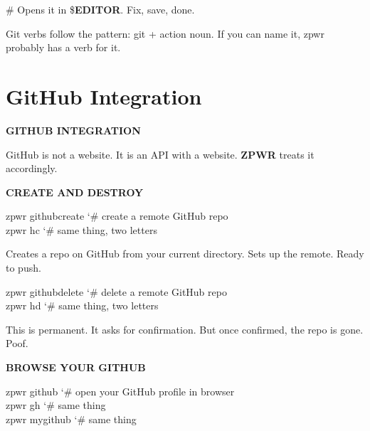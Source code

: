 \documentclass[11pt,a4paper,twoside]{book}
\begin{document}
\# Opens it in \$\textbf{EDITOR}. Fix, save, done.

Git verbs follow the pattern: git + action noun. If you can name it, zpwr probably has a verb for it.


\vspace{16pt}

\section{GitHub Integration}


\vspace{10pt}
{\large\bfseries\color{neoncyan} GITHUB INTEGRATION}\vspace{6pt}

GitHub is not a website. It is an API with a website. \textbf{ZPWR} treats it accordingly.


\vspace{12pt}
{\bfseries\color{neonyellow} CREATE AND DESTROY}\vspace{4pt}

\begin{codebox}
\color{neongreen}zpwr githubcreate      {\char`\#} create a remote GitHub repo\\
\color{neongreen}zpwr hc               {\char`\#} same thing, two letters\\
\end{codebox}

Creates a repo on GitHub from your current directory. Sets up the remote. Ready to push.

\begin{codebox}
\color{neongreen}zpwr githubdelete      {\char`\#} delete a remote GitHub repo\\
\color{neongreen}zpwr hd               {\char`\#} same thing, two letters\\
\end{codebox}

This is permanent. It asks for confirmation. But once confirmed, the repo is gone. Poof.


\vspace{12pt}
{\bfseries\color{neonyellow} BROWSE YOUR GITHUB}\vspace{4pt}

\begin{codebox}
\color{neongreen}zpwr github            {\char`\#} open your GitHub profile in browser\\
\color{neongreen}zpwr gh               {\char`\#} same thing\\
\color{neongreen}zpwr mygithub          {\char`\#} same thing\\
\end{codebox}
\end{document}
